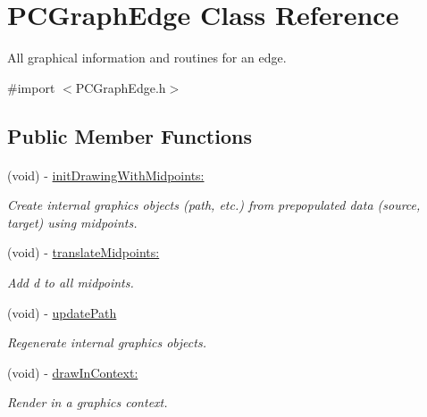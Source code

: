 \hypertarget{interface_p_c_graph_edge}{
\section{PCGraphEdge Class Reference}
\label{interface_p_c_graph_edge}
}


All graphical information and routines for an edge.  




{\ttfamily \#import $<$PCGraphEdge.h$>$}

\subsection*{Public Member Functions}
\paragraph*{}
\begin{DoxyCompactItemize}
\item 
(void) -\/ \hyperlink{interface_p_c_graph_edge_adcf3d51c1dcf9fb8f46e92ef420202eb}{initDrawingWithMidpoints:}
\begin{DoxyCompactList}\small\item\em Create internal graphics objects (path, etc.) from prepopulated data (source, target) using midpoints. \end{DoxyCompactList}\item 
\hypertarget{interface_p_c_graph_edge_a83dcb2873c1daaee1b9c4aaa4c8eab0d}{
(void) -\/ \hyperlink{interface_p_c_graph_edge_a83dcb2873c1daaee1b9c4aaa4c8eab0d}{translateMidpoints:}}
\label{interface_p_c_graph_edge_a83dcb2873c1daaee1b9c4aaa4c8eab0d}

\begin{DoxyCompactList}\small\item\em Add d to all midpoints. \end{DoxyCompactList}\item 
\hypertarget{interface_p_c_graph_edge_af49420f398efd28250a2f49a9edc0a04}{
(void) -\/ \hyperlink{interface_p_c_graph_edge_af49420f398efd28250a2f49a9edc0a04}{updatePath}}
\label{interface_p_c_graph_edge_af49420f398efd28250a2f49a9edc0a04}

\begin{DoxyCompactList}\small\item\em Regenerate internal graphics objects. \end{DoxyCompactList}\item 
\hypertarget{interface_p_c_graph_edge_a82847cafaf703e80dc4194bdbf2e9834}{
(void) -\/ \hyperlink{interface_p_c_graph_edge_a82847cafaf703e80dc4194bdbf2e9834}{drawInContext:}}
\label{interface_p_c_graph_edge_a82847cafaf703e80dc4194bdbf2e9834}

\begin{DoxyCompactList}\small\item\em Render in a graphics context. \end{DoxyCompactList}\end{DoxyCompactItemize}

